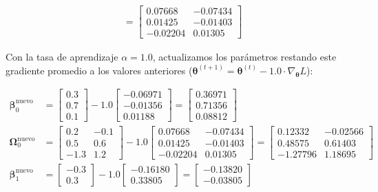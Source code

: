 \documentclass[10pt,a4paper]{article}
\begin{document}
{\begin{align*}
&= \mathbf{\begin{bmatrix} 0.07668 & -0.07434 \\ 0.01425 & -0.01403 \\ -0.02204 & 0.01305 \end{bmatrix}}
\end{align*}
}

Con la tasa de aprendizaje $\alpha = 1.0$, actualizamos los parámetros restando este gradiente promedio a los valores anteriores ($\boldsymbol{\theta}^{(t+1)} = \boldsymbol{\theta}^{(t)} - 1.0 \cdot \nabla_{\boldsymbol{\theta}} L$):

{\setlength{\abovedisplayskip}{2pt}\setlength{\belowdisplayskip}{2pt}\setlength{\jot}{0pt}
\begin{align*}
\boldsymbol{\beta}_0^{\text{nuevo}} &= \begin{bmatrix} 0.3 \\ 0.7 \\ 0.1 \end{bmatrix} - 1.0 \begin{bmatrix} -0.06971 \\ -0.01356 \\ 0.01188 \end{bmatrix} = \mathbf{\begin{bmatrix} 0.36971 \\ 0.71356 \\ 0.08812 \end{bmatrix}} \\[0.03cm]
\boldsymbol{\Omega}_0^{\text{nuevo}} &= \begin{bmatrix} 0.2 & -0.1 \\ 0.5 & 0.6 \\ -1.3 & 1.2 \end{bmatrix} - 1.0 \begin{bmatrix} 0.07668 & -0.07434 \\ 0.01425 & -0.01403 \\ -0.02204 & 0.01305 \end{bmatrix} = \mathbf{\begin{bmatrix} 0.12332 & -0.02566 \\ 0.48575 & 0.61403 \\ -1.27796 & 1.18695 \end{bmatrix}} \\[0.03cm]
\boldsymbol{\beta}_1^{\text{nuevo}} &= \begin{bmatrix} -0.3 \\ 0.3 \end{bmatrix} - 1.0 \begin{bmatrix} -0.16180 \\ 0.33805 \end{bmatrix} = \mathbf{\begin{bmatrix} -0.13820 \\ -0.03805 \end{bmatrix}} \\[0.03cm]

\end{align*}}
\end{document}
